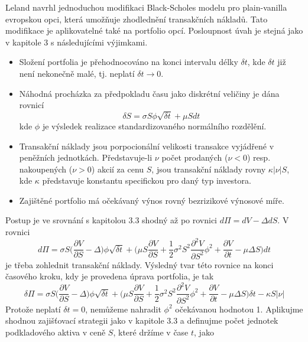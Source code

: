 \documentclass[a4paper]{book}
\begin{document}
Leland navrhl jednoduchou modifikaci Black-Scholes modelu pro plain-vanilla evropskou opci, která umožňuje zhodlednění transakčních nákladů. Tato modifikace je aplikovatelné také na portfolio opcí. Posloupnost úvah je stejná jako v kapitole 3 s následujícími výjimkami.
\begin{itemize}
\item Složení portfolia je přehodnocováno na konci intervalu délky $\delta t$, kde $\delta t$ již není nekonečně malé, tj. neplatí $\delta t \rightarrow 0$.
\item Náhodná procházka za předpokladu času jako diskrétní veličiny je dána rovnicí
\begin{equation*}
\delta S = \sigma S \phi \sqrt{\delta t} + \mu S dt
\end{equation*}
kde $\phi$ je výsledek realizace standardizovaného normálního rozdělění.
\item Transakční náklady jsou porpocionální velikosti transakce vyjádřené v peněžních jednotkách. Představuje-li $\nu$ počet prodaných ($\nu < 0$) resp. nakoupených ($\nu > 0$) akcií za cenu $S$, jsou transakční náklady rovny $\kappa |\nu| S$, kde $\kappa$ představuje konstantu specifickou pro daný typ investora.
\item Zajištěné portfolio má očekávaný výnos rovný bezrizikové výnosové míře.
\end{itemize}
Postup je ve srovnání s kapitolou 3.3 shodný až po rovnici $d \Pi = dV - \Delta dS$. V rovnici
\begin{equation*}
d\Pi = \sigma S \Bigg( \frac{\partial V}{\partial S} - \Delta \Bigg)\phi \sqrt{\delta t} + \Bigg( \mu S \frac{\partial V}{\partial S} + \frac{1}{2}\sigma^2S^2\frac{\partial^2 V}{\partial S^2}\phi^2 + \frac{\partial V}{\partial t} - \mu \Delta S \Bigg)dt
\end{equation*}
je třeba zohlednit transakční náklady. Výsledný tvar této rovnice na konci časového kroku, kdy je provedena úprava portfolia, je tak
\begin{equation}
\delta \Pi = \sigma S \Bigg( \frac{\partial V}{\partial S} - \Delta \Bigg) \phi \sqrt{\delta t} + \Bigg( \mu S \frac{\partial V}{\partial S} + \frac{1}{2}\sigma^2S^2\frac{\partial^2 V}{\partial S^2}\phi^2 + \frac{\partial V}{\partial t} - \mu \Delta S \Bigg) \delta t - \kappa S |\nu|
\end{equation}
Protože neplatí $\delta t = 0$, nemůžeme nahradit $\phi^2$ očekávanou hodnotou 1. Aplikujme shodnou zajišťovací strategii jako v kapitole 3.3 a definujme počet jednotek podkladového aktiva v ceně $S$, které držíme v čase $t$, jako
\end{document}
